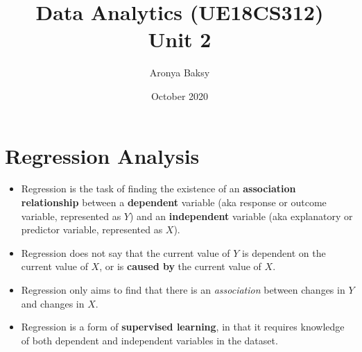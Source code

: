 \documentclass{article}
\title{Data Analytics (UE18CS312)\\
\large Unit 2}
\author{Aronya Baksy}
\date{October 2020}
\theoremstyle{plain}
\theoremstyle{definition}
\begin{document}
\maketitle

\section{Regression Analysis}
\begin{itemize}
    \item Regression is the task of finding the existence of an \textbf{association relationship} between a \textbf{dependent} variable (aka response or outcome variable, represented as $Y$) and an \textbf{independent} variable (aka explanatory or predictor variable, represented as $X$). 
    
    \item Regression does not say that the current value of $Y$ is dependent on the current value of $X$, or is \textbf{caused by} the current value of $X$.
    
    \item  Regression only aims to find that there is an \textit{association} between changes in $Y$ and changes in $X$. 
    
    \item Regression is a form of \textbf{supervised learning}, in that it requires knowledge of both dependent and independent variables in the dataset. 
\end{itemize}
\end{document}
